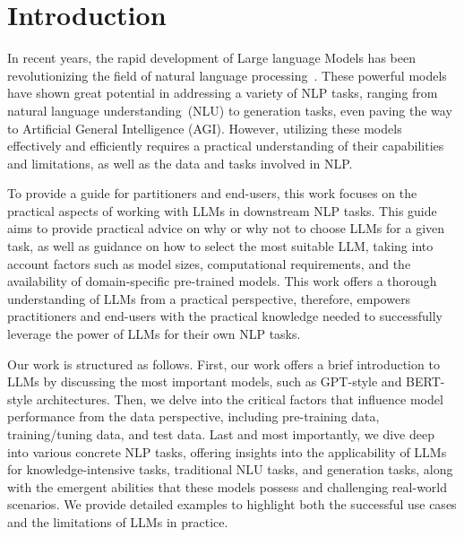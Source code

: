 \documentclass[manuscript,screen, nonacm]{acmart}
\begin{document}


\maketitle

\section{Introduction}\label{sec:intro}
In recent years, the rapid development of Large language Models has been revolutionizing the field of natural language processing~\cite{zhao2023survey, zhou2023comprehensive, bommasani2021opportunities}. These powerful models have shown great potential in addressing a variety of NLP tasks, ranging from natural language understanding~(NLU) to generation tasks, even paving the way to Artificial General Intelligence (AGI). However, utilizing these models effectively and efficiently requires a practical understanding of their capabilities and limitations, as well as the data and tasks involved in NLP. 

To provide a guide for partitioners and end-users, this work focuses on the practical aspects of working with LLMs in downstream NLP tasks. 
This guide aims to provide practical advice on why or why not to choose LLMs for a given task, as well as guidance on how to select the most suitable LLM, taking into account factors such as model sizes, computational requirements, and the availability of domain-specific pre-trained models.
This work offers a thorough understanding of LLMs from a practical perspective, therefore, empowers practitioners and end-users with the practical knowledge needed to successfully leverage the power of LLMs for their own NLP tasks.


Our work is structured as follows. First, our work offers a brief introduction to LLMs by discussing the most important models, such as GPT-style and BERT-style architectures. 
Then, we delve into the critical factors that influence model performance from the data perspective, including pre-training data, training/tuning data, and test data. 
Last and most importantly, we dive deep into various concrete NLP tasks, offering insights into the applicability of LLMs for knowledge-intensive tasks, traditional NLU tasks, and generation tasks, along with the emergent abilities that these models possess and challenging real-world scenarios. We provide detailed examples to highlight both the successful use cases and the limitations of LLMs in practice.
\end{document}
